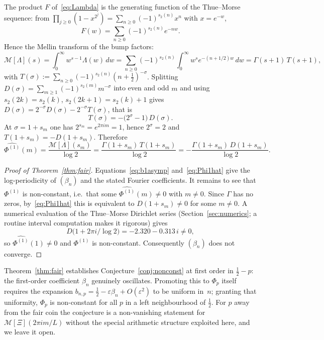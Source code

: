 \documentclass[11pt]{article}
\theoremstyle{definition}
\newcommand{\Mellin}{\mathcal{M}}
\begin{document}
The product $F$ of~\eqref{eq:Lambda} is the generating function of the
Thue--Morse sequence: from $\prod_{j\ge0}(1-x^{2^j})=
\sum_{n\ge0}(-1)^{s_2(n)}x^{n}$ \cite{AS} with $x=e^{-w}$,
\begin{equation}\label{eq:Fthue}
  F(w)=\sum_{n\ge0}(-1)^{s_2(n)}e^{-nw}.
\end{equation}
Hence the Mellin transform of the bump factors:
\[
  \Mellin[\Lambda](s)=\int_0^\infty\!w^{s-1}\Lambda(w)\,dw
  =\sum_{n\ge0}(-1)^{s_2(n)}\!\int_0^\infty\!w^{s}e^{-(n+1/2)w}\,dw
  =\Gamma(s+1)\,T(s+1),
\]
with $T(\sigma):=\sum_{n\ge0}(-1)^{s_2(n)}(n+\tfrac12)^{-\sigma}$.
Splitting $D(\sigma)=\sum_{m\ge1}(-1)^{s_2(m)}m^{-\sigma}$ into even
and odd $m$ and using $s_2(2k)=s_2(k)$, $s_2(2k+1)=s_2(k)+1$ gives
$D(\sigma)=2^{-\sigma}D(\sigma)-2^{-\sigma}T(\sigma)$, that is
\begin{equation}\label{eq:Tthue}
  T(\sigma)=-\bigl(2^{\sigma}-1\bigr)\,D(\sigma).
\end{equation}
At $\sigma=1+s_m$ one has $2^{s_m}=e^{2\pi i m}=1$, hence
$2^{\sigma}=2$ and $T(1+s_m)=-D(1+s_m)$. Therefore
\begin{equation}\label{eq:Phi1hat}
  \widehat{\Phi^{(1)}}(m)
   =\frac{\Mellin[\Lambda](s_m)}{\log2}
   =\frac{\Gamma(1+s_m)\,T(1+s_m)}{\log2}
   =-\frac{\Gamma(1+s_m)\,D(1+s_m)}{\log2}.
\end{equation}

\begin{proof}[Proof of Theorem~\ref{thm:fair}]
  Equations~\eqref{eq:b1asymp} and~\eqref{eq:Phi1hat} give the
  log-periodicity of $(\beta_n)$ and the stated Fourier coefficients.
  It remains to see that $\Phi^{(1)}$ is non-constant, i.e.\ that some
  $\widehat{\Phi^{(1)}}(m)\ne0$ with $m\ne0$. Since $\Gamma$ has no
  zeros, by~\eqref{eq:Phi1hat} this is equivalent to $D(1+s_m)\ne0$ for
  some $m\ne0$. A numerical evaluation of the Thue--Morse Dirichlet
  series (Section~\ref{sec:numerics}; a routine interval computation
  makes it rigorous) gives
  \[
    D\bigl(1+2\pi i/\log2\bigr)=-2.320-0.313\,i\ne0 ,
  \]
  so $\widehat{\Phi^{(1)}}(1)\ne0$ and $\Phi^{(1)}$ is non-constant.
  Consequently $(\beta_n)$ does not converge.
\end{proof}

Theorem~\ref{thm:fair} establishes Conjecture~\ref{conj:nonconst} at
first order in $\tfrac12-p$: the first-order coefficient $\beta_n$
genuinely oscillates. Promoting this to $\Phi_p$ itself requires the
expansion $b_{n,p}=\tfrac12-\varepsilon\beta_n+O(\varepsilon^2)$ to be
uniform in~$n$; granting that uniformity, $\Phi_p$ is non-constant for
all $p$ in a left neighbourhood of $\tfrac12$. For $p$ away from the
fair coin the conjecture is a non-vanishing statement for
$\Mellin[\Xi](2\pi i m/L)$ without the special arithmetic structure
exploited here, and we leave it open.
\end{document}
